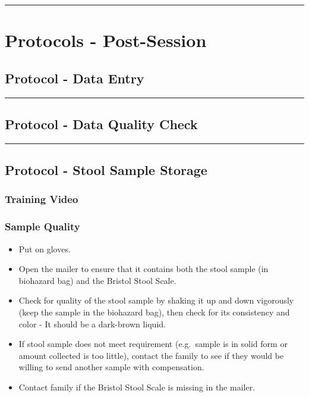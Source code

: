 \documentclass[]{book}
\providecommand{\tightlist}{%
  \setlength{\itemsep}{0pt}\setlength{\parskip}{0pt}}
\begin{document}
\begin{center}\rule{0.5\linewidth}{0.5pt}\end{center}

\hypertarget{protocols---post-session}{%
\section{Protocols - Post-Session}\label{protocols---post-session}}

\hypertarget{protocol---data-entry}{%
\subsection{Protocol - Data Entry}\label{protocol---data-entry}}

\begin{center}\rule{0.5\linewidth}{0.5pt}\end{center}

\hypertarget{protocol---data-quality-check}{%
\subsection{Protocol - Data Quality Check}\label{protocol---data-quality-check}}

\begin{center}\rule{0.5\linewidth}{0.5pt}\end{center}

\hypertarget{protocol---stool-sample-storage}{%
\subsection{Protocol - Stool Sample Storage}\label{protocol---stool-sample-storage}}

\hypertarget{training-video}{%
\subsubsection{Training Video}\label{training-video}}

\hypertarget{sample-quality}{%
\subsubsection{Sample Quality}\label{sample-quality}}

\begin{itemize}
\tightlist
\item
  Put on gloves.
\item
  Open the mailer to ensure that it contains both the stool sample (in biohazard bag) and the Bristol Stool Scale.
\item
  Check for quality of the stool sample by shaking it up and down vigorously (keep the sample in the biohazard bag), then check for its consistency and color - It should be a dark-brown liquid.
\item
  If stool sample does not meet requirement (e.g.~sample is in solid form or amount collected is too little), contact the family to see if they would be willing to send another sample with compensation.
\item
  Contact family if the Bristol Stool Scale is missing in the mailer.
\end{itemize}
\end{document}

